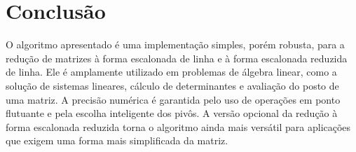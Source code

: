 \chapter{Conclusão}

O algoritmo apresentado é uma implementação simples, porém robusta, para a redução de matrizes à forma escalonada de linha e à forma escalonada reduzida de linha. Ele é amplamente utilizado em problemas de álgebra linear, como a solução de sistemas lineares, cálculo de determinantes e avaliação do posto de uma matriz. A precisão numérica é garantida pelo uso de operações em ponto flutuante e pela escolha inteligente dos pivôs. A versão opcional da redução à forma escalonada reduzida torna o algoritmo ainda mais versátil para aplicações que exigem uma forma mais simplificada da matriz.
